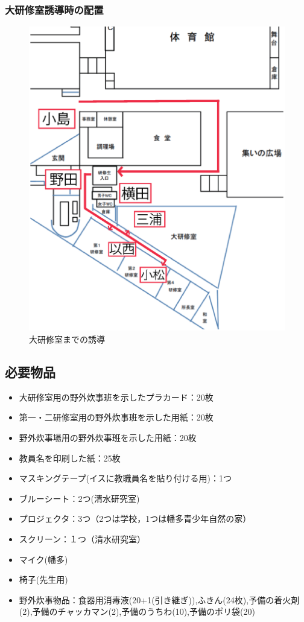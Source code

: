 \subsubsection{大研修室誘導時の配置}
\begin{figure}[htbp]
  \begin{center}
   \includegraphics[scale=0.4]{./03/yuudou.eps}
  \end{center}
  \caption{大研修室までの誘導}
  \label{fig:hare}
\end{figure}

\newpage

\subsection{必要物品}
\begin{itemize}
\item 大研修室用の野外炊事班を示したプラカード：20枚
\item 第一・二研修室用の野外炊事班を示した用紙：20枚
\item 野外炊事場用の野外炊事班を示した用紙：20枚
\item 教員名を印刷した紙：25枚
\item マスキングテープ(イスに教職員名を貼り付ける用)：1つ
\item ブルーシート：2つ(清水研究室)
\item プロジェクタ：3つ（2つは学校，1つは幡多青少年自然の家）
\item スクリーン：１つ（清水研究室）
\item マイク(幡多)
\item 椅子(先生用)
\item 野外炊事物品：食器用消毒液(20+1(引き継ぎ)),ふきん(24枚),予備の着火剤(2),予備のチャッカマン(2),予備のうちわ(10),予備のポリ袋(20)
\end{itemize}

